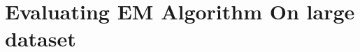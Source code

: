 \documentclass{article}
\begin{document}
    \section{Evaluating EM Algorithm On large dataset}

    
    

    
\end{document}
